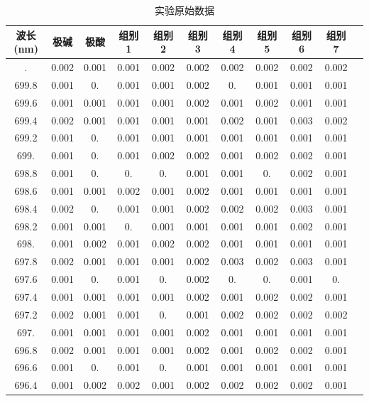 \documentclass[12pt]{ctexart}
\numberwithin{equation}{section}
\begin{document}
\begin{longtable}{ccccccccccc}
    \caption{实验原始数据} \\
    \hline
    波长(nm) & 极碱 & 极酸 & 组别 1 & 组别 2 & 组别 3 &
    组别 4 & 组别 5 & 组别 6 & 组别 7 \\
    \hline
    \endhead
    \hline
    \endfoot
    700.	&	0.002	&	0.001	&	0.001	&	0.002	&	0.002	&	0.002	&	0.002	&	0.002	&	0.002	\\
699.8	&	0.001	&	0.	&	0.001	&	0.001	&	0.002	&	0.	&	0.001	&	0.001	&	0.001	\\
699.6	&	0.001	&	0.001	&	0.001	&	0.001	&	0.002	&	0.001	&	0.002	&	0.001	&	0.001	\\
699.4	&	0.002	&	0.001	&	0.001	&	0.001	&	0.001	&	0.002	&	0.001	&	0.003	&	0.002	\\
699.2	&	0.001	&	0.	&	0.001	&	0.001	&	0.001	&	0.001	&	0.001	&	0.001	&	0.001	\\
699.	&	0.001	&	0.	&	0.001	&	0.002	&	0.002	&	0.001	&	0.002	&	0.002	&	0.001	\\
698.8	&	0.001	&	0.	&	0.	&	0.	&	0.001	&	0.001	&	0.	&	0.002	&	0.001	\\
698.6	&	0.001	&	0.001	&	0.002	&	0.001	&	0.002	&	0.001	&	0.001	&	0.001	&	0.001	\\
698.4	&	0.002	&	0.	&	0.001	&	0.001	&	0.002	&	0.002	&	0.002	&	0.003	&	0.001	\\
698.2	&	0.001	&	0.001	&	0.	&	0.001	&	0.001	&	0.001	&	0.001	&	0.002	&	0.001	\\
698.	&	0.001	&	0.002	&	0.001	&	0.002	&	0.002	&	0.001	&	0.001	&	0.001	&	0.001	\\
697.8	&	0.002	&	0.001	&	0.001	&	0.001	&	0.002	&	0.003	&	0.002	&	0.003	&	0.001	\\
697.6	&	0.001	&	0.	&	0.001	&	0.	&	0.002	&	0.	&	0.	&	0.001	&	0.	\\
697.4	&	0.001	&	0.001	&	0.001	&	0.001	&	0.002	&	0.001	&	0.002	&	0.002	&	0.001	\\
697.2	&	0.002	&	0.001	&	0.001	&	0.	&	0.001	&	0.002	&	0.002	&	0.002	&	0.002	\\
697.	&	0.001	&	0.001	&	0.001	&	0.001	&	0.002	&	0.001	&	0.001	&	0.001	&	0.001	\\
696.8	&	0.002	&	0.001	&	0.001	&	0.001	&	0.002	&	0.001	&	0.002	&	0.002	&	0.001	\\
696.6	&	0.001	&	0.	&	0.001	&	0.	&	0.001	&	0.001	&	0.001	&	0.001	&	0.001	\\
696.4	&	0.001	&	0.002	&	0.002	&	0.001	&	0.002	&	0.002	&	0.002	&	0.002	&	0.001	\\

\end{longtable}
\end{document}
